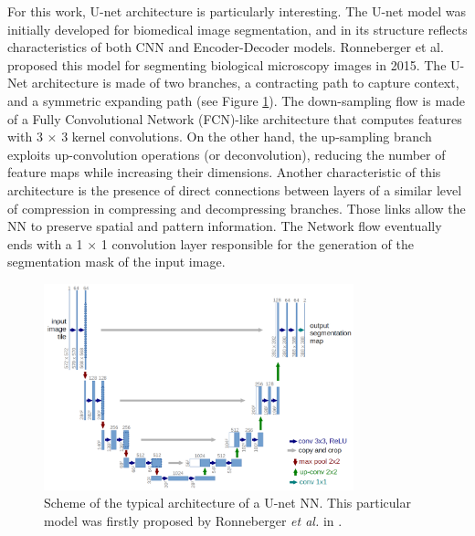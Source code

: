 For this work, U-net architecture is particularly interesting. The U-net model was initially developed for biomedical image segmentation, and in its structure reflects characteristics of both CNN and Encoder-Decoder models. Ronneberger et al.\cite{U-net} proposed this model for segmenting biological microscopy images in 2015. The U-Net architecture is made of two branches, a contracting path to capture context, and a symmetric expanding path (see Figure \ref{fig:unet}). The down-sampling flow is made of a Fully Convolutional Network (FCN)-like architecture that computes features with 3 $\times$ 3 kernel convolutions. On the other hand, the up-sampling branch exploits up-convolution operations (or deconvolution), reducing the number of feature maps while increasing their dimensions. Another characteristic of this architecture is the presence of direct connections between layers of a similar level of compression in compressing and decompressing branches. Those links allow the NN to preserve spatial and pattern information. The Network flow eventually ends with a 1 $\times$ 1 convolution layer responsible for the generation of the segmentation mask of the input image.

    \begin{figure}
        \centering
        \includegraphics[width = 0.8\textwidth]{images/unet}
        \caption{Scheme of the typical architecture of a U-net NN. This particular model was firstly proposed by Ronneberger \textit{et al.} in \cite{U-net}.}
        \label{fig:unet}
    \end{figure}

